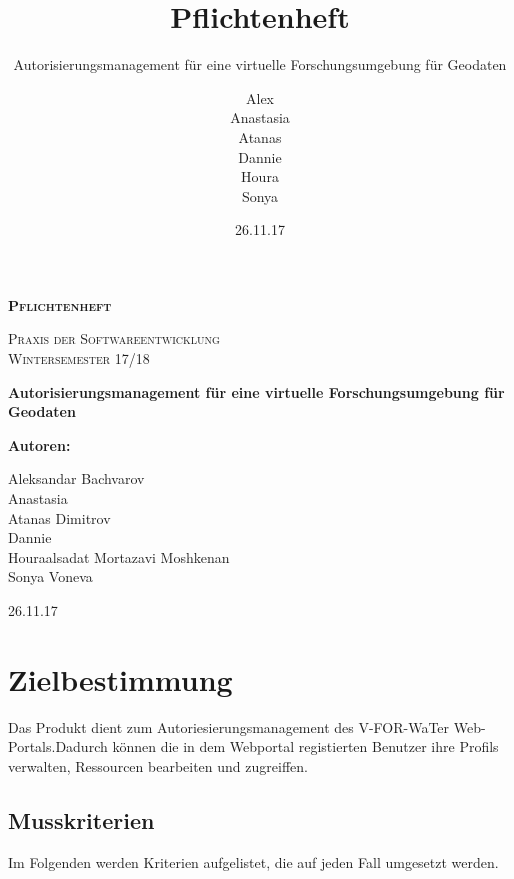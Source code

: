 \documentclass[parskip=full,11pt]{scrartcl}
\title{Pflichtenheft}
\subtitle{Autorisierungsmanagement für eine virtuelle Forschungsumgebung für Geodaten}
\author{Alex\\Anastasia\\Atanas\\Dannie\\ Houra\\Sonya\\}
\date{26.11.17}
\begin{document}
\begin{titlepage}
	
	\begin{center}
	{\scshape\LARGE\bfseries Pflichtenheft \par}
	\vspace{1cm}
	{\scshape\Large Praxis der Softwareentwicklung\\}
	\vspace{1cm}
	{\scshape\Large Wintersemester 17/18\\}
	\vspace{3cm}
	{\huge\bfseries Autorisierungsmanagement für eine virtuelle Forschungsumgebung für Geodaten\par}
	\vspace{2cm}
	\vfill
	{\bfseries {\Large Autoren}:\par}
	{\Large Aleksandar Bachvarov}\\%
	{\Large Anastasia}\\%
	{\Large Atanas Dimitrov}\\%
	{\Large Dannie}\\%
	{\Large Houraalsadat Mortazavi Moshkenan}\\
	{\Large Sonya Voneva}\\%
	\vfill
	{\large 26.11.17 \par}
	\end{center}
\end{titlepage}
\tableofcontents

\newpage
\section{Zielbestimmung}
Das Produkt dient  zum Autoriesierungsmanagement des  \gls{V-FOR-WaTer} Web-Portals.Dadurch können die in dem Webportal registierten \gls{Benutzer} ihre Profils verwalten, Ressourcen bearbeiten und zugreiffen.

\subsection{Musskriterien}
Im Folgenden werden Kriterien aufgelistet, die auf jeden Fall umgesetzt werden.
\end{document}
